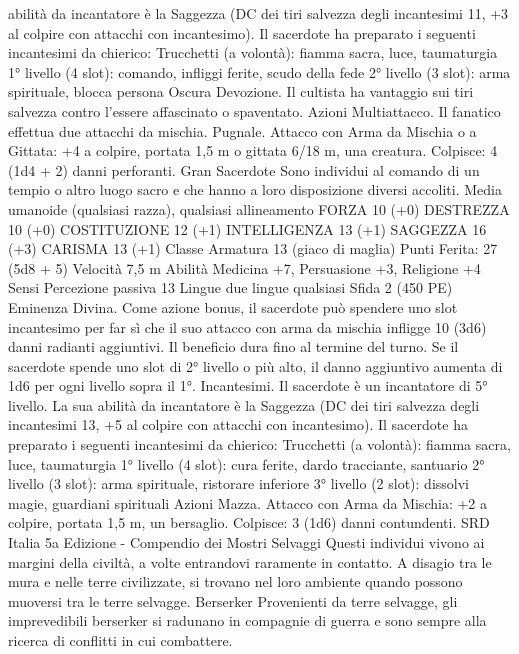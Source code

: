 \begin{multicols}{2}
abilità da incantatore è la Saggezza (DC dei tiri salvezza degli
incantesimi 11, +3 al colpire con attacchi con incantesimo). Il
sacerdote ha preparato i seguenti incantesimi da chierico:
Trucchetti (a volontà): fiamma sacra, luce, taumaturgia
1° livello (4 slot): comando, infliggi ferite, scudo della fede
2° livello (3 slot): arma spirituale, blocca persona
Oscura Devozione. Il cultista ha vantaggio sui tiri salvezza
contro l’essere affascinato o spaventato.
Azioni
Multiattacco. Il fanatico effettua due attacchi da mischia.
Pugnale. Attacco con Arma da Mischia o a Gittata: +4 a colpire,
portata 1,5 m o gittata 6/18 m, una creatura.
Colpisce: 4 (1d4 + 2) danni perforanti.
Gran Sacerdote
Sono individui al comando di un tempio o altro luogo
sacro e che hanno a loro disposizione diversi accoliti.
Media umanoide (qualsiasi razza), qualsiasi allineamento
FORZA 10 (+0)
DESTREZZA 10 (+0)
COSTITUZIONE 12 (+1)
INTELLIGENZA 13 (+1)
SAGGEZZA 16 (+3)
CARISMA 13 (+1)
Classe Armatura 13 (giaco di maglia)
\hspace*{0pt}\hfill{Punti Ferita}: 27 (5d8 + 5)
Velocità 7,5 m
Abilità Medicina +7, Persuasione +3, Religione +4
Sensi Percezione passiva 13
Lingue due lingue qualsiasi
Sfida 2 (450 PE)
Eminenza Divina. Come azione bonus, il sacerdote può spendere
uno slot incantesimo per far sì che il suo attacco con arma da
mischia infligge 10 (3d6) danni radianti aggiuntivi. Il beneficio
dura fino al termine del turno. Se il sacerdote spende uno slot di
2° livello o più alto, il danno aggiuntivo aumenta di 1d6 per ogni
livello sopra il 1°.
Incantesimi. Il sacerdote è un incantatore di 5° livello. La sua
abilità da incantatore è la Saggezza (DC dei tiri salvezza degli
incantesimi 13, +5 al colpire con attacchi con incantesimo). Il
sacerdote ha preparato i seguenti incantesimi da chierico:
Trucchetti (a volontà): fiamma sacra, luce, taumaturgia
1° livello (4 slot): cura ferite, dardo tracciante, santuario
2° livello (3 slot): arma spirituale, ristorare inferiore
3° livello (2 slot): dissolvi magie, guardiani spirituali
Azioni
Mazza. Attacco con Arma da Mischia: +2 a colpire, portata 1,5
m, un bersaglio.
Colpisce: 3 (1d6) danni contundenti.
SRD Italia 5a Edizione - Compendio dei Mostri
Selvaggi
Questi individui vivono ai margini della civiltà, a volte
entrandovi raramente in contatto. A disagio tra le mura
e nelle terre civilizzate, si trovano nel loro ambiente
quando possono muoversi tra le terre selvagge.
Berserker
Provenienti da terre selvagge, gli imprevedibili
berserker si radunano in compagnie di guerra e sono
sempre alla ricerca di conflitti in cui combattere.

\end{multicols}
